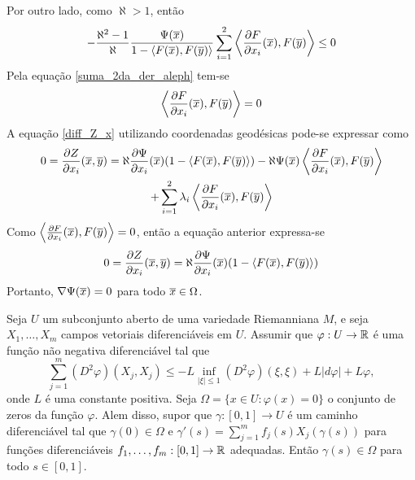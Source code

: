 \begin{demonstracao}
\begin{equation*}
	\end{equation*}	
	Por outro lado, como $\aleph > 1$, então
	\begin{equation*}
		- \frac{\aleph^2 - 1}{\aleph} \frac{\Psi(\overline{x})}{1 - \langle F(\overline{x}), F(\overline{y}) \rangle} \sum_{i=1}^2 \left\langle \frac{\partial F}{\partial x_i}(\overline{x}), F(\overline{y}) \right\rangle \leq 0
	\end{equation*}	
	Pela equação \eqref{suma_2da_der_aleph} tem-se
	\begin{equation*}
		\left\langle \frac{\partial F}{\partial x_i}(\overline{x}), F(\overline{y}) \right\rangle = 0
	\end{equation*}	
	A equação \eqref{diff_Z_x} utilizando coordenadas geodésicas pode-se expressar como
	\begin{multline*}
		0 = \frac{\partial Z}{\partial x_i}(\overline{x},\overline{y}) = \aleph \frac{\partial \Psi}{\partial x_i}(\overline{x})(1 - \langle F(\overline{x}),F(\overline{y}) \rangle)  - \aleph \Psi(\overline{x}) \left\langle \frac{\partial F}{\partial x_i}(\overline{x}), F(\overline{y}) \right\rangle\\
		+ \sum_{i=1}^2 \lambda_i \left\langle \frac{\partial F}{\partial x_i}(\overline{x}),F(\overline{y}) \right\rangle
	\end{multline*}	
	Como $\left\langle \frac{\partial F}{\partial x_i}(\overline{x}),F(\overline{y}) \right\rangle = 0$, então a equação anterior expressa-se
	\begin{equation*}
		0 = \frac{\partial Z}{\partial x_i}(\overline{x},\overline{y}) = \aleph \frac{\partial \Psi}{\partial x_i}(\overline{x})(1 - \langle F(\overline{x}),F(\overline{y}) \rangle)
	\end{equation*}	
	Portanto, $\nabla \Psi(\overline{x}) = 0$ para todo $\overline{x} \in \Omega$.
\end{demonstracao}

\begin{lema}\label{bony}
	Seja $U$ um subconjunto aberto de uma variedade Riemanniana $M$, e seja $X_1, \ldots, X_m$ campos vetoriais diferenciáveis em $U$. Assumir que $\varphi: U \rightarrow \mathbb{R}$ é uma função não negativa diferenciável tal que
	\begin{equation*}
		\sum_{j=1}^{m} (D^2 \varphi)(X_j,X_j) \leq -L \inf_{|\xi| \leq 1} (D^2 \varphi)(\xi,\xi) + L |d \varphi| + L \varphi,
	\end{equation*}
	onde $L$ é uma constante positiva. Seja $\Omega = \{ x \in U: \varphi(x) = 0 \}$ o conjunto de zeros da função $\varphi$. Alem disso, supor que $\gamma: [0,1] \rightarrow U$ é um caminho diferenciável tal que $\gamma(0) \in \Omega$ e $\gamma'(s) = \sum_{j=1}^{m} f_j(s) X_j(\gamma(s))$ para funções diferenciáveis $f_1, \ldots, f_m: [0,1] \rightarrow \mathbb{R}$ adequadas. Então $\gamma(s) \in \Omega$ para todo $s \in [0,1]$.
\end{lema}

